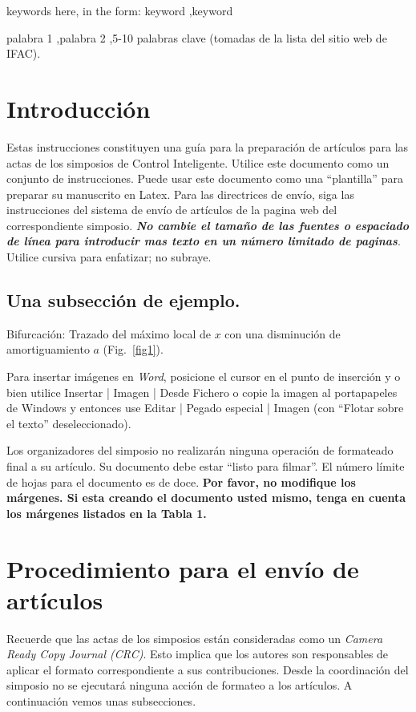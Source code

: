 \documentclass[5p,times,authoryear]{elsarticle}
\begin{document}
\begin{frontmatter}
\begin{keyword}
 keywords here, in the form: keyword \sep keyword

palabra 1 \sep palabra 2 \sep 5-10 palabras clave (tomadas de la lista del sitio web de IFAC).

\end{keyword}

\end{frontmatter}


\section{Introducción}
Estas instrucciones constituyen una guía para la preparación de artículos para las actas de los simposios de Control Inteligente. Utilice este documento como un conjunto de instrucciones. Puede usar este documento como una ``plantilla'' para preparar su manuscrito en Latex. Para las directrices de envío, siga las instrucciones del sistema de envío de artículos de la pagina web del correspondiente simposio. {\bf{\emph {No cambie el tamaño de las fuentes o espaciado de línea para introducir mas texto en un número limitado de paginas}}}.  Utilice cursiva para enfatizar; no subraye.

\subsection{Una subsección de ejemplo.}
Bifurcación: Trazado del máximo local de $x$ con una disminución de amortiguamiento $a$ (Fig.~\ref{fig1}).

Para insertar imágenes en \emph{Word}, posicione el cursor en el punto de inserción y o bien utilice Insertar | Imagen | Desde Fichero o copie la imagen al portapapeles de Windows y entonces use Editar | Pegado especial | Imagen (con ``Flotar sobre el texto'' deseleccionado).

Los organizadores del simposio no realizarán ninguna operación de formateado final a su artículo. Su documento debe estar ``listo para filmar''. El número límite de hojas para el documento es de doce. {\bf Por favor, no modifique los márgenes. Si esta creando el documento usted mismo, tenga en cuenta los márgenes listados en la Tabla 1.}

\section{Procedimiento para el envío de artículos}

Recuerde que las actas de los simposios están consideradas como un \emph{Camera Ready Copy Journal (CRC)}. Esto implica que los autores son responsables de aplicar el formato correspondiente a sus contribuciones. Desde la coordinación del simposio no se ejecutará ninguna acción de formateo a los artículos. A continuación vemos unas subsecciones.
\end{document}
